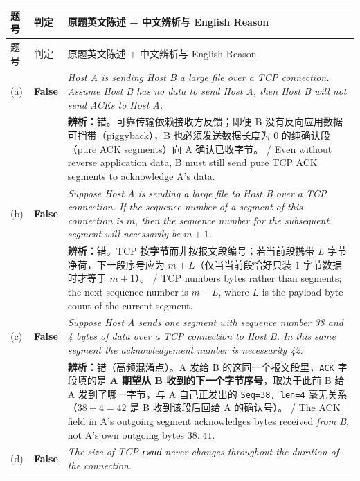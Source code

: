 \begingroup\small\setlength{\tabcolsep}{3pt}\renewcommand{\arraystretch}{1.24}
\begin{longtable}{@{}>{\raggedright\arraybackslash}p{}>{\raggedright\arraybackslash}p{}>{\raggedright\arraybackslash}p{}@{}}
\toprule
题号 & 判定 & 原题英文陈述 + 中文辨析与 English Reason \\
\midrule\endfirsthead
题号 & 判定 & 原题英文陈述 + 中文辨析与 English Reason \\
\midrule\endhead
\bottomrule\endfoot
(a) & \textbf{False} & \emph{Host A is sending Host B a large file over a TCP connection. Assume Host B has no data to send Host A, then Host B will not send ACKs to Host A.} \\
& & \textbf{辨析：}错。可靠传输依赖接收方反馈；即便 B 没有反向应用数据可捎带（piggyback），B 也必须发送数据长度为 0 的纯确认段（pure ACK segments）向 A 确认已收字节。 / Even without reverse application data, B must still send pure TCP ACK segments to acknowledge A's data. \\
(b) & \textbf{False} & \emph{Suppose Host A is sending a large file to Host B over a TCP connection. If the sequence number of a segment of this connection is $m$, then the sequence number for the subsequent segment will necessarily be $m+1$.} \\
& & \textbf{辨析：}错。TCP 按\textbf{字节}而非按报文段编号；若当前段携带 $L$ 字节净荷，下一段序号应为 $m + L$（仅当当前段恰好只装 $1$ 字节数据时才等于 $m+1$）。 / TCP numbers bytes rather than segments; the next sequence number is $m + L$, where $L$ is the payload byte count of the current segment. \\
(c) & \textbf{False} & \emph{Suppose Host A sends one segment with sequence number 38 and 4 bytes of data over a TCP connection to Host B. In this same segment the acknowledgement number is necessarily 42.} \\
& & \textbf{辨析：}错（高频混淆点）。A 发给 B 的这同一个报文段里，\texttt{ACK} 字段填的是 \textbf{A 期望从 B 收到的下一个字节序号}，取决于此前 B 给 A 发到了哪一字节，与 A 自己正发出的 \texttt{Seq=38, len=4} 毫无关系（$38+4=42$ 是 B 收到该段后回给 A 的确认号）。 / The ACK field in A's outgoing segment acknowledges bytes received \emph{from B}, not A's own outgoing bytes $38..41$. \\
(d) & \textbf{False} & \emph{The size of TCP \texttt{rwnd} never changes throughout the duration of the connection.} \\

\end{longtable}
